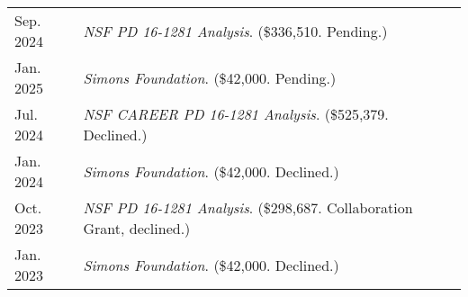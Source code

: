
    \medskip


    \medskip
    
    \begin{center}
    {
    \renewcommand{\arraystretch}{1.5}
    \begin{longtable}{p{}  p{}}
     Sep.  2024 & \textit{NSF PD 16-1281 Analysis}. (\$336,510. Pending.) \\ 
 Jan.  2025 & \textit{Simons Foundation}. (\$42,000. Pending.) \\ 
 Jul.  2024 & \textit{NSF CAREER PD 16-1281 Analysis}. (\$525,379. Declined.) \\ 
 Jan.  2024 & \textit{Simons Foundation}. (\$42,000. Declined.) \\ 
 Oct.  2023 & \textit{NSF PD 16-1281 Analysis}. (\$298,687. Collaboration Grant, declined.) \\ 
 Jan.  2023 & \textit{Simons Foundation}. (\$42,000. Declined.) 
    \end{longtable}
    } 
    \end{center}

    \vspace{-1em}
    